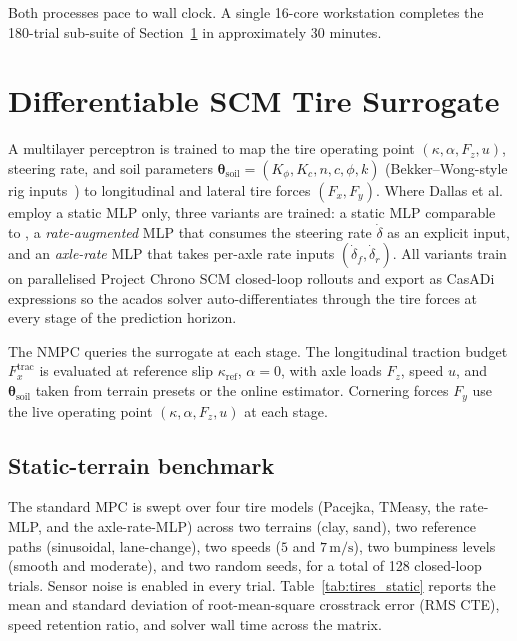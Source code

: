 \documentclass[conference,letterpaper,10pt]{IEEEtran}
\begin{document}
Both processes pace to wall clock. A single 16-core workstation
completes the 180-trial sub-suite of Section~\ref{sec:tires} in
approximately 30 minutes.

\section{Differentiable SCM Tire Surrogate}
\label{sec:tires}

A multilayer perceptron is trained to map the tire operating point
$(\kappa,\alpha,F_z,u)$, steering rate, and soil parameters
$\boldsymbol{\theta}_{\mathrm{soil}} = (K_\phi, K_c, n, c, \phi, k)$
(Bekker--Wong-style rig inputs~\cite{Shibly05}) to longitudinal and
lateral tire forces $(F_x, F_y)$. Where Dallas et
al.~\cite{Dallas21} employ a static MLP only, three variants are
trained: a static MLP comparable to \cite{Dallas21}, a
\emph{rate-augmented} MLP that consumes the steering rate
$\dot\delta$ as an explicit input, and an \emph{axle-rate} MLP that
takes per-axle rate inputs $(\dot\delta_f, \dot\delta_r)$. All
variants train on parallelised Project Chrono SCM closed-loop
rollouts and export as CasADi expressions so the acados solver
auto-differentiates through the tire forces at every stage of the
prediction horizon.

The NMPC queries the surrogate at each stage. The longitudinal
traction budget $F_x^{\mathrm{trac}}$ is evaluated at reference slip
$\kappa_{\mathrm{ref}}$, $\alpha = 0$, with axle loads $F_z$, speed
$u$, and $\boldsymbol{\theta}_{\mathrm{soil}}$ taken from terrain
presets or the online estimator. Cornering forces $F_y$ use the live
operating point $(\kappa, \alpha, F_z, u)$ at each stage.

\subsection{Static-terrain benchmark}
\label{sec:tires_static}

The standard MPC is swept over four tire models (Pacejka, TMeasy,
the rate-MLP, and the axle-rate-MLP) across two terrains (clay,
sand), two reference paths (sinusoidal, lane-change), two speeds
($5$ and $7\,\mathrm{m/s}$), two bumpiness levels (smooth and
moderate), and two random seeds, for a total of 128 closed-loop
trials. Sensor noise is enabled in every trial.
Table~\ref{tab:tires_static} reports the mean and standard deviation
of root-mean-square crosstrack error (RMS CTE), speed retention
ratio, and solver wall time across the matrix.
\end{document}
